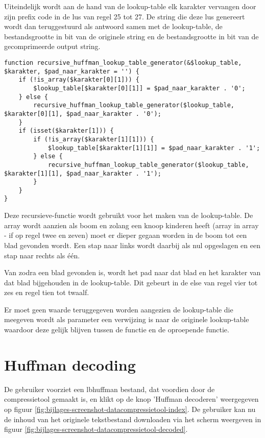 Uiteindelijk wordt aan de hand van de \gls{lookup-table} elk karakter vervangen door zijn prefix code in de lus van regel 25 tot 27. De \gls{string} die deze lus genereert wordt dan teruggestuurd als antwoord samen met de \gls{lookup-table}, de bestandsgrootte in \gls{bit} van de originele \gls{string} en de bestandsgrootte in \gls{bit} van de gecomprimeerde output \gls{string}.

\begin{lstlisting}
function recursive_huffman_lookup_table_generator(&$lookup_table, $karakter, $pad_naar_karakter = '') {
	if (!is_array($karakter[0][1])) {
		$lookup_table[$karakter[0][1]] = $pad_naar_karakter . '0';
	} else {
		recursive_huffman_lookup_table_generator($lookup_table, $karakter[0][1], $pad_naar_karakter . '0');
	}
	if (isset($karakter[1])) {
		if (!is_array($karakter[1][1])) {
			$lookup_table[$karakter[1][1]] = $pad_naar_karakter . '1';
		} else {
			recursive_huffman_lookup_table_generator($lookup_table, $karakter[1][1], $pad_naar_karakter . '1');
		}
	}
}
\end{lstlisting}

Deze \gls{recursieve-functie} wordt gebruikt voor het maken van de \gls{lookup-table}. De \gls{array} wordt aanzien als boom en zolang een knoop kinderen heeft (array in array - if op regel twee en zeven) moet er dieper gegaan worden in de boom tot een blad gevonden wordt. Een stap naar links wordt daarbij als nul opgeslagen en een stap naar rechts als één. 

Van zodra een blad gevonden is, wordt het pad naar dat blad en het karakter van dat blad bijgehouden in de \gls{lookup-table}. Dit gebeurt in de else van regel vier tot zes en regel tien tot twaalf.

Er moet geen waarde teruggegeven worden aangezien de \gls{lookup-table} die meegeven wordt als parameter een verwijzing is naar de originele \gls{lookup-table} waardoor deze gelijk blijven tussen de functie en de oproepende functie.

\section{Huffman decoding}
\label{sec:compressietool-huffman-decoding}

De gebruiker voorziet een \gls{lbhuffman} bestand, dat voordien door de \gls{compressietool} gemaakt is, en klikt op de knop 'Huffman decoderen' weergegeven op figuur \ref{fig:bijlages-screenshot-datacompressietool-index}. De gebruiker kan nu de inhoud van het originele tekstbestand downloaden via het scherm weergeven in figuur \ref{fig:bijlages-screenshot-datacompressietool-decoded}.

